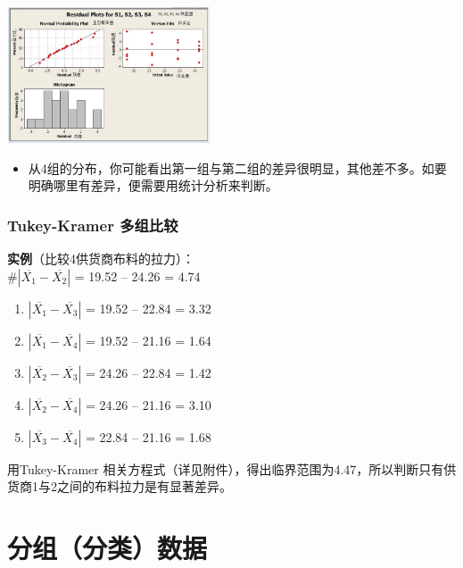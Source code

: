 \includegraphics[width=6cm]{Anova3inOneScreenshot_2022-08-07_125131-1.jpg}

\begin{itemize}
\tightlist
\item
  从4组的分布，你可能看出第一组与第二组的差异很明显，其他差不多。如要明确哪里有差异，便需要用统计分析来判断。
\end{itemize}

\hypertarget{tukey-kramer-ux591aux7ec4ux6bd4ux8f83}{%
\subsubsection{Tukey-Kramer
多组比较}\label{tukey-kramer-ux591aux7ec4ux6bd4ux8f83}}

\textbf{实例}（比较4供货商布料的拉力）：\\
\#\(|\overline{X_1} - \overline{X_2} |\) = \textbar{}19.52 --
24.26\textbar{} = 4.74

\begin{enumerate}
\tightlist
\item
  \(|\overline{X_1} - \overline{X_3} |\) = \textbar{}19.52 --
  22.84\textbar{} = 3.32
\item
  \(|\overline{X_1} - \overline{X_4} |\) = \textbar{}19.52 --
  21.16\textbar{} = 1.64
\item
  \(|\overline{X_2} - \overline{X_3} |\) = \textbar{}24.26 --
  22.84\textbar{} = 1.42
\item
  \(|\overline{X_2} - \overline{X_4} |\) = \textbar{}24.26 --
  21.16\textbar{} = 3.10
\item
  \(|\overline{X_3} - \overline{X_4} |\) = \textbar{}22.84 --
  21.16\textbar{} = 1.68
\end{enumerate}

用Tukey-Kramer
相关方程式（详见附件），得出临界范围为4.47，所以判断只有供货商1与2之间的布料拉力是有显著差异。

\hypertarget{ux5206ux7ec4ux5206ux7c7bux6570ux636e}{%
\section{分组（分类）数据}\label{ux5206ux7ec4ux5206ux7c7bux6570ux636e}}

